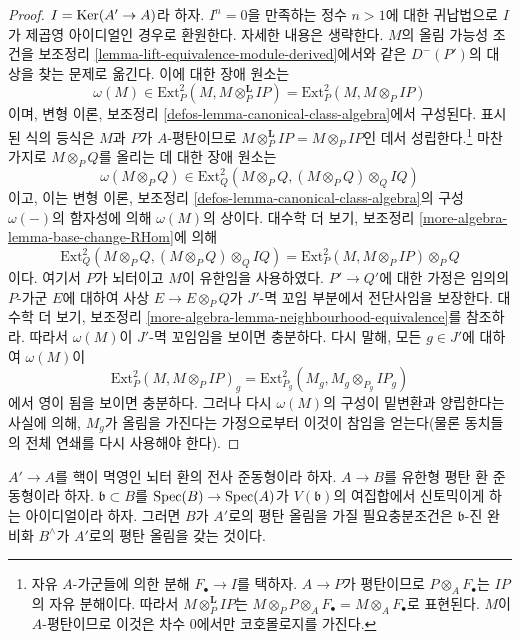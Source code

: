 \begin{proof}
$I = \mathop{\mathrm{Ker}}(A' \to A)$라 하자. $I^n = 0$을 만족하는 정수 $n > 1$에 대한
귀납법으로 $I$가 제곱영 아이디얼인 경우로 환원한다. 자세한 내용은
생략한다. $M$의 올림 가능성 조건을 보조정리
\ref{lemma-lift-equivalence-module-derived}에서와 같은 $D^-(P')$의 대상을
찾는 문제로 옮긴다. 이에 대한 장애 원소는
$$
\omega(M) \in \text{Ext}^2_P(M, M \otimes_P^\mathbf{L} IP) =
\text{Ext}^2_P(M, M \otimes_P IP)
$$
이며, 변형 이론, 보조정리
\ref{defos-lemma-canonical-class-algebra}에서 구성된다. 표시된 식의 등식은
$M$과 $P$가 $A$-평탄이므로
$M \otimes_P^\mathbf{L} IP = M \otimes_P IP$인 데서 성립한다.\footnote{
자유 $A$-가군들에 의한 분해 $F_\bullet \to I$를 택하자.
$A \to P$가 평탄이므로 $P \otimes_A F_\bullet$는 $IP$의 자유 분해이다.
따라서 $M \otimes_P^\mathbf{L} IP$는
$M \otimes_P P \otimes_A F_\bullet = M \otimes_A F_\bullet$로 표현된다.
$M$이 $A$-평탄이므로 이것은 차수 $0$에서만 코호몰로지를 가진다.}
마찬가지로 $M \otimes_P Q$를 올리는 데 대한 장애 원소는
$$
\omega(M \otimes_P Q) \in
\text{Ext}^2_Q(M \otimes_P Q, (M \otimes_P Q) \otimes_Q IQ)
$$
이고, 이는 변형 이론, 보조정리
\ref{defos-lemma-canonical-class-algebra}의 구성 $\omega(-)$의 함자성에 의해
$\omega(M)$의 상이다. 대수학 더 보기, 보조정리
\ref{more-algebra-lemma-base-change-RHom}에 의해
$$
\text{Ext}^2_Q(M \otimes_P Q, (M \otimes_P Q) \otimes_Q IQ) =
\text{Ext}^2_P(M, M \otimes_P IP) \otimes_P Q
$$
이다. 여기서 $P$가 뇌터이고 $M$이 유한임을 사용하였다.%
$P' \to Q'$에 대한 가정은 임의의 $P$-가군 $E$에 대하여%
사상 $E \to E \otimes_P Q$가 $J'$-멱 꼬임 부분에서 전단사임을 보장한다.
대수학 더 보기, 보조정리
\ref{more-algebra-lemma-neighbourhood-equivalence}를 참조하라. 따라서
$\omega(M)$이 $J'$-멱 꼬임임을 보이면 충분하다. 다시 말해, 모든
$g \in J'$에 대하여 $\omega(M)$이
$$
\text{Ext}^2_P(M, M \otimes_P IP)_g =
\text{Ext}^2_{P_g}(M_g, M_g \otimes_{P_g} IP_g)
$$
에서 영이 됨을 보이면 충분하다. 그러나 다시 $\omega(M)$의 구성이
밑변환과 양립한다는 사실에 의해, $M_g$가 올림을 가진다는 가정으로부터
이것이 참임을 얻는다(물론 동치들의 전체 연쇄를 다시 사용해야 한다).%
\end{proof}

\begin{lemma}
\label{lemma-lift-equivalence}
$A' \to A$를 핵이 멱영인 뇌터 환의 전사 준동형이라 하자.
$A \to B$를 유한형 평탄 환 준동형이라 하자.
$\mathfrak b \subset B$를 $\mathop{\mathrm{Spec}}(B) \to \mathop{\mathrm{Spec}}(A)$가
$V(\mathfrak b)$의 여집합에서 신토믹이게 하는 아이디얼이라 하자.
그러면 $B$가 $A'$로의 평탄 올림을 가질 필요충분조건은
$\mathfrak b$-진 완비화 $B^\wedge$가 $A'$로의 평탄 올림을 갖는 것이다.
\end{lemma}

